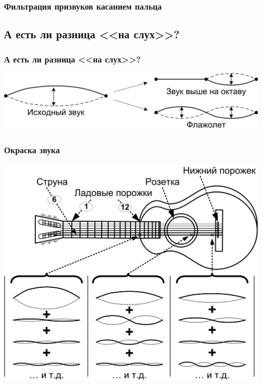 \begin{frame}
    \frametitle{Фильтрация призвуков касанием пальца}

    \begin{center}
    \end{center}
\end{frame}


\subsection{А есть ли разница <<на слух>>?}

\begin{frame}
    \frametitle{А есть ли разница <<на слух>>?}

    \begin{center}
        \includegraphics[width=\textwidth]{figs/string-flagol-vs-octave}
    \end{center}
\end{frame}


\appendix

\begin{frame}
    \frametitle{Окраска звука}

    \begin{center}
        \includegraphics[width=.6\textwidth]{figs/obertone-color}
    \end{center}
\end{frame}

